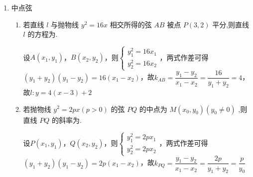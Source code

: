 \begin{enumerate}
\begin{enumerate}
\begin{jieda}
\begin{enumerate}
                所以 $\Delta  = {16}{k}^{2} + 4\left( {{4k} + 2}\right)  > 0,{x}_{1} + {x}_{2} = {4k},{x}_{1}{x}_{2} =  - {4k} - 2$ 
                
                因为 $\angle {APB}$ 的角平分线与 $y$ 轴垂直，所以 ${k}_{PA} + {k}_{PB} = 0$，所以 ${k}_{PA} + {k}_{PB} = \dfrac{{y}_{1} - 1}{{x}_{1} - 2} + \dfrac{{y}_{2} - 1}{{x}_{2} - 2} = 0$，即 $\dfrac{\dfrac{{x}_{1}^{2}}{4} - 1}{{x}_{1} - 2} + \dfrac{\dfrac{{x}_{2}^{2}}{4} - 1}{{x}_{2} - 2} = 0$，即 ${x}_{1} + {x}_{2} + 4 = 0$，所以 $k =  - 1,{x}_{1} + {x}_{2} =  - 4,{x}_{1}{x}_{2} = 2$，所以 $\left| {AB}\right|  = \sqrt{1 + {k}^{2}}\left| {{x}_{1} - {x}_{2}}\right|  = \sqrt{1 + {k}^{2}}\sqrt{{\left( {x}_{1} + {x}_{2}\right) }^{2} - 4{x}_{1}{x}_{2}} = 4$ .
            \end{enumerate}
        \end{jieda}
    \end{enumerate}
    
    \item 中点弦
    \begin{enumerate}
        \item 若直线 $l$ 与抛物线 ${y}^{2} = {16x}$ 相交所得的弦 ${AB}$ 被点 $P\left( {3,2}\right)$ 平分,则直线 $l$ 的方程为.
        \begin{jieda}
            设$A(x_1, y_1)$，$B(x_2, y_2)$，则$\left\{\begin{array}{l}
                 y_1^2 = 16x_1  \\
                 y_2^2 = 16x_2 
            \end{array}\right.$，两式作差可得$(y_1+y_2)(y_1-y_2) = 16(x_1-x_2)$，故$k_{AB} = \dfrac{y_1-y_2}{x_1-x_2} = \dfrac{16}{y_1+y_2} = 4$，故$l: y = 4(x-3)+2$
        \end{jieda}
        \item 若抛物线 ${y}^{2} = {2px}\left( {p > 0}\right)$ 的弦 ${PQ}$ 的中点为 $M\left( {{x}_{0},{y}_{0}}\right) \left( {{y}_{0} \neq  0}\right)$ ,则直线 ${PQ}$ 的斜率为.
        \begin{jieda}
            设$P(x_1, y_1)$，$Q(x_2, y_2)$，则$\left\{\begin{array}{l}
                 y_1^2 = 2px_1  \\
                 y_2^2 = 2px_2 
            \end{array}\right.$，两式作差可得$(y_1+y_2)(y_1-y_2) = 2p(x_1-x_2)$，故$k_{PQ} = \dfrac{y_1-y_2}{x_1-x_2} = \dfrac{2p}{y_1+y_2} = \dfrac{p}{y_0}$
        \end{jieda}


\end{enumerate}
\end{enumerate}
